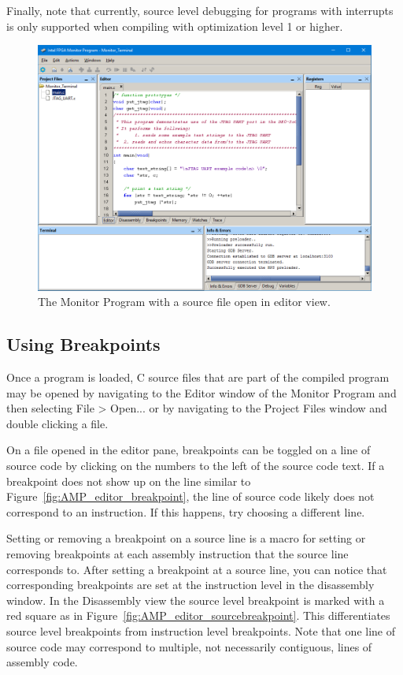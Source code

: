 \documentclass[11pt, twoside, pdftex]{article}
\begin{document}
Finally, note that currently, source level debugging for programs with interrupts is only supported
when compiling with optimization level 1 or higher.

\begin{figure}[h]
	\begin{center}
		\includegraphics[scale=0.5]{screenshots/AMP_editor.png}
	\end{center}
	\caption{The Monitor Program with a source file open in editor view.}
	\label{fig:AMP_editor}
\end{figure}

\subsection{Using Breakpoints}
Once a program is loaded, C source files that are part of the compiled program 
may be opened by navigating to the {\sf Editor} window of the Monitor Program and then
selecting {\sf File > Open...} or by navigating to the {\sf Project Files} window and
double clicking a file.

On a file opened in the editor pane,  breakpoints can be toggled on a line of source code by clicking on the numbers to the 
left of the source code text. If a breakpoint does not show up on the line similar to Figure~\ref{fig:AMP_editor_breakpoint}, the line of source code 
likely does not correspond to an instruction. If this happens, try choosing a different line.

Setting or removing a breakpoint on a source line is a macro for setting or removing breakpoints
at each assembly instruction that the source line corresponds to. After setting a breakpoint
at a source line, you can notice that corresponding breakpoints are set at the instruction level
in the disassembly window. In the Disassembly view the source level breakpoint is marked with a red 
square as in Figure~\ref{fig:AMP_editor_sourcebreakpoint}. This differentiates source level breakpoints from instruction level breakpoints.
Note that one line of source code may correspond to multiple, not necessarily contiguous, lines of assembly code.
\end{document}
